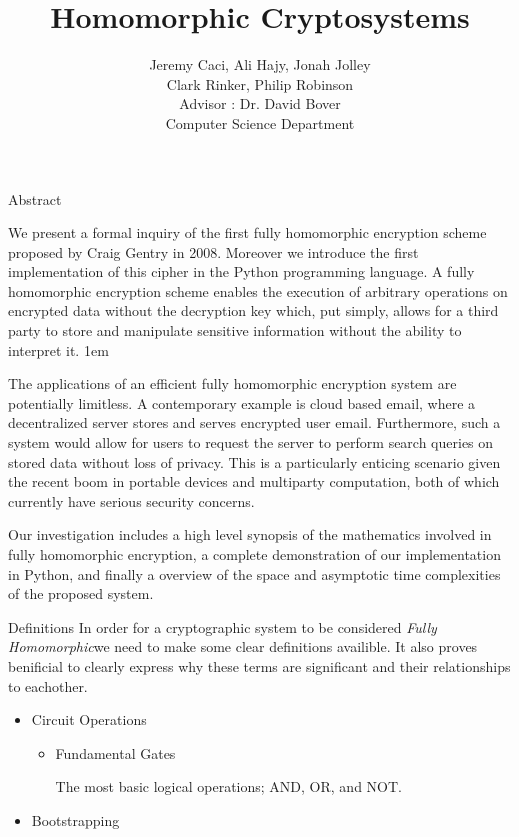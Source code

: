 \documentclass[a0,portrait]{a0poster}
\title{Homomorphic Cryptosystems}
\author{
Jeremy Caci, Ali Hajy, Jonah Jolley\\
Clark Rinker, Philip Robinson\\
Advisor : Dr. David Bover\\
Computer Science Department
}
\begin{document}
\maketitle

\def\fh{{\em Fully Homomorphic\xspace}}

\begin{multicols}{2}
\begin{slide}{Abstract}

We present a formal inquiry of the first fully homomorphic encryption scheme proposed by Craig Gentry in 2008. Moreover we introduce the first implementation of this cipher in the Python programming language. A fully homomorphic encryption scheme enables the execution of arbitrary operations on encrypted data without the decryption key which, put simply, allows for a third party to  store and manipulate sensitive information without the ability to interpret it. 
\parskip 1em

The applications of an efficient fully homomorphic encryption system are potentially limitless. A contemporary example is cloud based email, where a decentralized server stores and serves encrypted user email. Furthermore, such a system would allow for users to request the server to perform search queries on stored data without loss of privacy. This is a particularly enticing scenario given the recent boom in portable devices and multiparty computation, both of which currently have serious security concerns. 

Our investigation includes a high level synopsis of the mathematics involved in fully homomorphic encryption, a complete demonstration of our implementation in Python, and finally a overview of the space and asymptotic time complexities of the proposed system. 

\end{slide}

\begin{slide}{Definitions}
In order for a cryptographic system to be considered \fh we need to make some clear definitions availible. It also proves benificial to clearly express why these terms are significant and their relationships to eachother. 

\begin{itemize}
\item Circuit Operations
\begin{itemize}
\item Fundamental Gates

  The most basic logical operations; AND, OR, and NOT. 
\end{itemize}
\item Bootstrapping


\end{itemize}
\end{slide}
\end{multicols}
\end{document}
